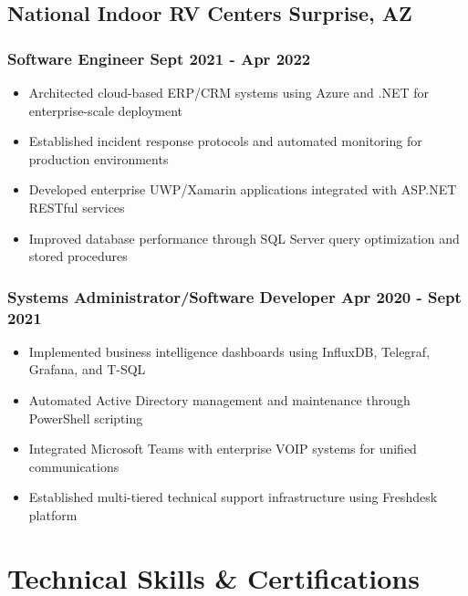 \documentclass[11pt]{article} %
\begin{document}
\subsection{National Indoor RV Centers \hfill Surprise, AZ}
\subsubsection{Software Engineer \hfill Sept 2021 - Apr 2022}
\begin{itemize}
	\item Architected cloud-based ERP/CRM systems using Azure and .NET for enterprise-scale deployment
	\item Established incident response protocols and automated monitoring for production environments
	\item Developed enterprise UWP/Xamarin applications integrated with ASP.NET RESTful services
	\item Improved database performance through SQL Server query optimization and stored procedures
	\end{itemize}
	
	\subsubsection{Systems Administrator/Software Developer \hfill Apr 2020 - Sept 2021}
	\begin{itemize}
	\item Implemented business intelligence dashboards using InfluxDB, Telegraf, Grafana, and T-SQL
	\item Automated Active Directory management and maintenance through PowerShell scripting
	\item Integrated Microsoft Teams with enterprise VOIP systems for unified communications
	\item Established multi-tiered technical support infrastructure using Freshdesk platform
\end{itemize}

\section{Technical Skills \& Certifications}
\end{document}
